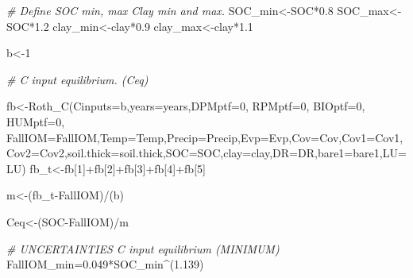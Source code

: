 \documentclass[
  10pt,
  b5paper,
]{book}
\newenvironment{Shaded}{\begin{snugshade}}{\end{snugshade}}
\newcommand{\AttributeTok}[1]{\textcolor[rgb]{0.77,0.63,0.00}{#1}}
\newcommand{\CommentTok}[1]{\textcolor[rgb]{0.56,0.35,0.01}{\textit{#1}}}
\newcommand{\DecValTok}[1]{\textcolor[rgb]{0.00,0.00,0.81}{#1}}
\newcommand{\FloatTok}[1]{\textcolor[rgb]{0.00,0.00,0.81}{#1}}
\newcommand{\FunctionTok}[1]{\textcolor[rgb]{0.00,0.00,0.00}{#1}}
\newcommand{\NormalTok}[1]{#1}
\newcommand{\OtherTok}[1]{\textcolor[rgb]{0.56,0.35,0.01}{#1}}
\newcommand{\SpecialCharTok}[1]{\textcolor[rgb]{0.00,0.00,0.00}{#1}}
\begin{document}
\begin{Shaded}
\begin{Highlighting}[]
\CommentTok{\# Define SOC min, max Clay min and max. }
\NormalTok{SOC\_min}\OtherTok{\textless{}{-}}\NormalTok{SOC}\SpecialCharTok{*}\FloatTok{0.8}
\NormalTok{SOC\_max}\OtherTok{\textless{}{-}}\NormalTok{SOC}\SpecialCharTok{*}\FloatTok{1.2}
\NormalTok{clay\_min}\OtherTok{\textless{}{-}}\NormalTok{clay}\SpecialCharTok{*}\FloatTok{0.9}
\NormalTok{clay\_max}\OtherTok{\textless{}{-}}\NormalTok{clay}\SpecialCharTok{*}\FloatTok{1.1}

\NormalTok{b}\OtherTok{\textless{}{-}}\DecValTok{1}

\CommentTok{\# C input equilibrium. (Ceq)}

\NormalTok{fb}\OtherTok{\textless{}{-}}\FunctionTok{Roth\_C}\NormalTok{(}\AttributeTok{Cinputs=}\NormalTok{b,}\AttributeTok{years=}\NormalTok{years,}\AttributeTok{DPMptf=}\DecValTok{0}\NormalTok{, }\AttributeTok{RPMptf=}\DecValTok{0}\NormalTok{, }\AttributeTok{BIOptf=}\DecValTok{0}\NormalTok{, }\AttributeTok{HUMptf=}\DecValTok{0}\NormalTok{, }\AttributeTok{FallIOM=}\NormalTok{FallIOM,}\AttributeTok{Temp=}\NormalTok{Temp,}\AttributeTok{Precip=}\NormalTok{Precip,}\AttributeTok{Evp=}\NormalTok{Evp,}\AttributeTok{Cov=}\NormalTok{Cov,}\AttributeTok{Cov1=}\NormalTok{Cov1,}\AttributeTok{Cov2=}\NormalTok{Cov2,}\AttributeTok{soil.thick=}\NormalTok{soil.thick,}\AttributeTok{SOC=}\NormalTok{SOC,}\AttributeTok{clay=}\NormalTok{clay,}\AttributeTok{DR=}\NormalTok{DR,}\AttributeTok{bare1=}\NormalTok{bare1,}\AttributeTok{LU=}\NormalTok{LU)}
\NormalTok{fb\_t}\OtherTok{\textless{}{-}}\NormalTok{fb[}\DecValTok{1}\NormalTok{]}\SpecialCharTok{+}\NormalTok{fb[}\DecValTok{2}\NormalTok{]}\SpecialCharTok{+}\NormalTok{fb[}\DecValTok{3}\NormalTok{]}\SpecialCharTok{+}\NormalTok{fb[}\DecValTok{4}\NormalTok{]}\SpecialCharTok{+}\NormalTok{fb[}\DecValTok{5}\NormalTok{]}

\NormalTok{m}\OtherTok{\textless{}{-}}\NormalTok{(fb\_t}\SpecialCharTok{{-}}\NormalTok{FallIOM)}\SpecialCharTok{/}\NormalTok{(b)}

\NormalTok{Ceq}\OtherTok{\textless{}{-}}\NormalTok{(SOC}\SpecialCharTok{{-}}\NormalTok{FallIOM)}\SpecialCharTok{/}\NormalTok{m}

\CommentTok{\# UNCERTAINTIES C input equilibrium (MINIMUM)}
\NormalTok{FallIOM\_min}\OtherTok{=}\FloatTok{0.049}\SpecialCharTok{*}\NormalTok{SOC\_min}\SpecialCharTok{\^{}}\NormalTok{(}\FloatTok{1.139}\NormalTok{) }


\end{Highlighting}
\end{Shaded}
\end{document}
